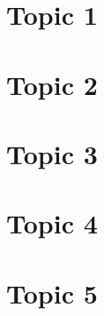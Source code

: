 \documentclass[11pt, oneside]{article}
\begin{document}


\section{Topic 1}



\section{Topic 2}



\section{Topic 3}



\section{Topic 4}



\section{Topic 5}


\end{document}
